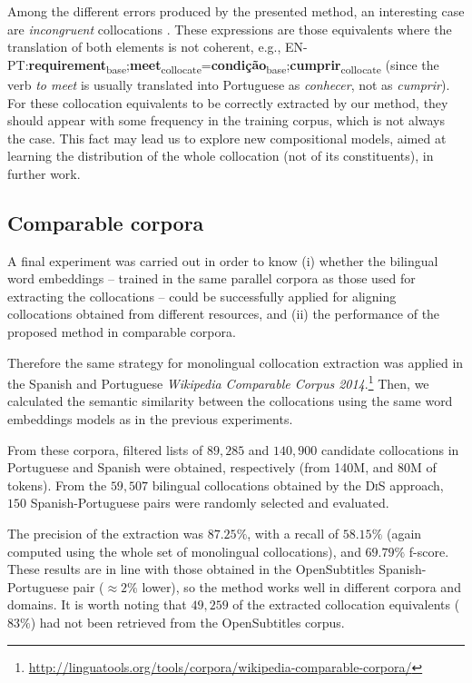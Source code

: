 \documentclass[output=paper
,modfonts
,nonflat]{langsci/langscibook}
\begin{document}
Among the different errors produced by the presented method, an interesting case
are \emph{incongruent} collocations \citep{nesselhauf2003}. These expressions are
those equivalents where the translation of both elements is not coherent, e.g.,
EN-PT:\textbf{requirement}\textsubscript{base};\textbf{meet}\textsubscript{collocate}=\textbf{condição}\textsubscript{base};\textbf{cumprir}\textsubscript{collocate} (since the verb \textit{to meet} is usually translated into Portuguese as \textit{conhecer}, not as \textit{cumprir}).
For these collocation equivalents to be correctly extracted by our method, they should
appear with some frequency in the training corpus, which is not always the case. This fact
may lead us to explore new compositional models, aimed at learning the distribution of the
whole collocation (not of its constituents), in further work.

\subsection{Comparable corpora}
A final experiment was carried out in order to know (i) whether the bilingual
word embeddings -- trained in the same parallel corpora as those used for
extracting the collocations -- could be successfully applied for aligning collocations
obtained from different resources, and (ii) the performance of the proposed
method in comparable corpora.

Therefore the same strategy for monolingual collocation extraction was applied in the Spanish and Portuguese
\emph{Wikipedia Comparable Corpus 2014}.\footnote{\scriptsize{\url{http://linguatools.org/tools/corpora/wikipedia-comparable-corpora/}}}
Then, we calculated the semantic similarity between the collocations using the same word embeddings
models as in the previous experiments.

From these corpora, filtered lists of $89,285$ and $140,900$ candidate collocations in Portuguese
and Spanish were obtained, respectively (from 140M, and 80M of tokens). From the $59,507$ bilingual
collocations obtained by the \textsc{DiS} approach, $150$ Spanish-Portuguese pairs were randomly selected
and evaluated.

The precision of the extraction was $87.25\%$, with a recall of $58.15\%$ (again computed
using the whole set of monolingual collocations), and $69.79\%$ f-score. These results are
in line with those obtained in the OpenSubtitles Spanish-Portuguese pair ($\approx2\%$ lower),
so the method works well in different corpora and domains. It is worth noting that
$49,259$ of the extracted collocation equivalents ($83\%$) had not been retrieved from
the OpenSubtitles corpus.
\end{document}
